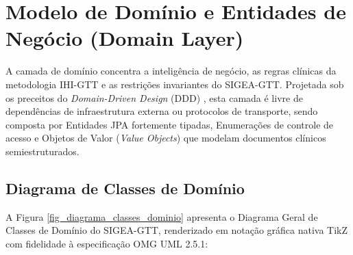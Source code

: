 \chapter{Modelo de Domínio e Entidades de Negócio (Domain Layer)}
\label{cap_modelo_dominio}

A camada de domínio concentra a inteligência de negócio, as regras clínicas da metodologia IHI-GTT e as restrições invariantes do SIGEA-GTT. Projetada sob os preceitos do \textit{Domain-Driven Design} (DDD) \cite{evans2003}, esta camada é livre de dependências de infraestrutura externa ou protocolos de transporte, sendo composta por Entidades JPA fortemente tipadas, Enumerações de controle de acesso e Objetos de Valor (\textit{Value Objects}) que modelam documentos clínicos semiestruturados.

\section{Diagrama de Classes de Domínio}
\label{sec_diagrama_classes_dominio}

A Figura \ref{fig_diagrama_classes_dominio} apresenta o Diagrama Geral de Classes de Domínio do SIGEA-GTT, renderizado em notação gráfica nativa TikZ com fidelidade à especificação OMG UML 2.5.1:


